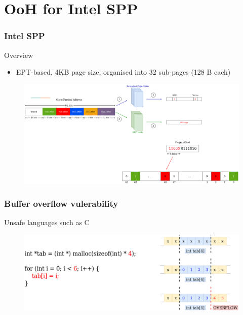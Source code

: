 \documentclass[xcolor=table,bigger,unknownkeysallowed]{beamer}
\begin{document}
\section{OoH for Intel SPP}
        \begin{frame}
        \frametitle{Intel SPP} 
			\begin{block}{Overview}
				\begin{itemize}
					\item EPT-based, 4KB page size, organised into 32 sub-pages (128 B each)
				\end{itemize}
			\end{block}
 		    \begin{figure}
			\centering
				\includegraphics[width=.8\columnwidth]{fig/spp}
			\end{figure}			
        \end{frame}
        \begin{frame}
        \frametitle{Buffer overflow vulerability} 
			\begin{block}{Unsafe languages such as C}
 		    \begin{figure}
			\centering
				\includegraphics[width=1\columnwidth]{fig/overflow}
			\end{figure}	
			\end{block}		
        \end{frame}      
\end{document}
